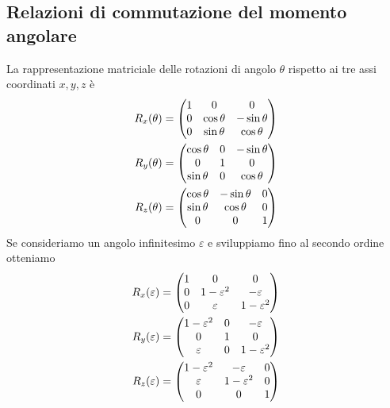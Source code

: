 \documentclass{article}
\begin{document}
\subsection{Relazioni di commutazione del momento angolare}
La rappresentazione matriciale delle rotazioni di angolo $\theta$ rispetto ai tre assi coordinati $x, y, z$ è
\begin{align}
    R_x(\theta) &= \begin{pmatrix}
        1 & 0 & 0 \\
        0 & \cos \theta & -\sin \theta \\
        0 & \sin \theta & \cos \theta
    \end{pmatrix} \notag \\
    R_y(\theta) &= \begin{pmatrix}
        \cos \theta & 0 & -\sin \theta \\
        0 & 1 & 0 \\
        \sin \theta & 0 & \cos \theta
    \end{pmatrix} \notag \\
    R_z(\theta) &= \begin{pmatrix}
        \cos \theta & -\sin \theta & 0 \\
        \sin \theta & \cos \theta & 0 \\
        0 & 0 & 1
    \end{pmatrix} \notag
\end{align}
Se consideriamo un angolo infinitesimo $\varepsilon$ e sviluppiamo fino al secondo ordine otteniamo
\begin{align}
    R_x(\varepsilon) &= \begin{pmatrix}
        1 & 0 & 0 \\
        0 & 1 - \varepsilon^2 & -\varepsilon \\
        0 & \varepsilon & 1 - \varepsilon^2
    \end{pmatrix} \notag \\
    R_y(\varepsilon) &= \begin{pmatrix}
        1 - \varepsilon^2 & 0 & -\varepsilon \\
        0 & 1 & 0 \\
        \varepsilon & 0 & 1 - \varepsilon^2
    \end{pmatrix} \notag \\
    R_z(\varepsilon) &= \begin{pmatrix}
        1 - \varepsilon^2 & -\varepsilon & 0 \\
        \varepsilon & 1 - \varepsilon^2 & 0 \\
        0 & 0 & 1
    \end{pmatrix} \notag
\end{align}
\end{document}
